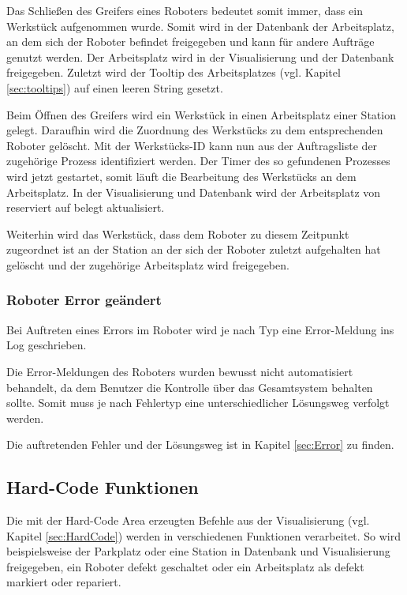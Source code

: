 Das Schließen des Greifers eines Roboters bedeutet somit immer, dass ein Werkstück aufgenommen wurde. Somit wird in der Datenbank der Arbeitsplatz, an dem sich der Roboter befindet freigegeben und kann für andere Aufträge genutzt werden. Der Arbeitsplatz wird in der Visualisierung und der Datenbank freigegeben. Zuletzt wird der Tooltip des Arbeitsplatzes (vgl. Kapitel \ref{sec:tooltips}) auf einen leeren String gesetzt. 

Beim Öffnen des Greifers wird ein Werkstück in einen Arbeitsplatz einer Station gelegt. Daraufhin wird die Zuordnung des Werkstücks zu dem entsprechenden Roboter gelöscht. Mit der Werkstücks-ID kann nun aus der Auftragsliste der zugehörige Prozess identifiziert werden. Der Timer des so gefundenen Prozesses wird jetzt gestartet, somit läuft die Bearbeitung des Werkstücks an dem Arbeitsplatz. In der Visualisierung und Datenbank wird der Arbeitsplatz von reserviert auf belegt aktualisiert.

Weiterhin wird das Werkstück, dass dem Roboter zu diesem Zeitpunkt zugeordnet ist an der Station an der sich der Roboter zuletzt aufgehalten hat gelöscht und der zugehörige Arbeitsplatz wird freigegeben. 

\subsubsection{Roboter Error geändert}

Bei Auftreten eines Errors im Roboter wird je nach Typ eine Error-Meldung ins Log geschrieben. 

Die Error-Meldungen des Roboters wurden bewusst nicht automatisiert behandelt, da dem Benutzer die Kontrolle über das Gesamtsystem behalten sollte. Somit muss je nach Fehlertyp eine unterschiedlicher Lösungsweg verfolgt werden. 

Die auftretenden Fehler und der Lösungsweg ist in Kapitel \ref{sec:Error} zu finden. 

\subsection{Hard-Code Funktionen}

Die mit der Hard-Code Area erzeugten Befehle aus der Visualisierung (vgl. Kapitel \ref{sec:HardCode}) werden in verschiedenen Funktionen verarbeitet. So wird beispielsweise der Parkplatz oder eine Station in Datenbank und Visualisierung freigegeben, ein Roboter defekt geschaltet oder ein Arbeitsplatz als defekt markiert oder repariert. 

